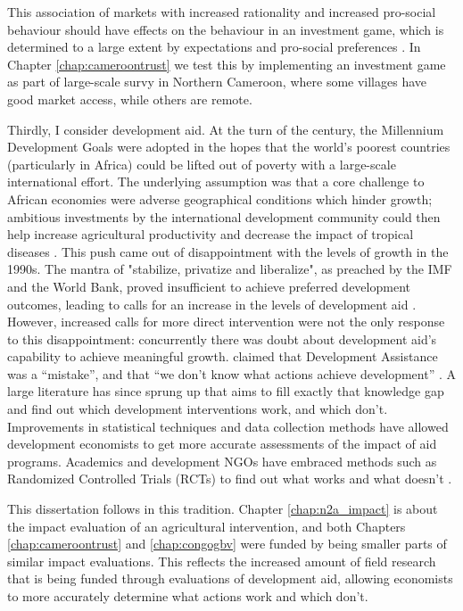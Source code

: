 This association of markets with increased rationality and increased pro-social behaviour should have effects on the behaviour in an investment game, which is determined to a large extent by expectations and pro-social preferences \citep{Berg1995,Ashraf2006,Roth1995,Sapienza2013}. In Chapter \ref{chap:cameroontrust} we test this by implementing an investment game as part of large-scale survy in Northern Cameroon, where some villages have good market access, while others are remote.


Thirdly, I consider development aid. At the turn of the century, the Millennium Development Goals were adopted in the hopes that the world's poorest countries (particularly in Africa) could be lifted out of poverty with a large-scale international effort. The underlying assumption was that a core challenge to African economies were adverse geographical conditions which hinder growth; ambitious investments by the international development community could then help increase agricultural productivity and decrease the impact of tropical diseases \citep{Sachs2005}. This push came out of disappointment with the levels of growth in the 1990s. The mantra of "stabilize, privatize and liberalize", as preached by the IMF and the World Bank, proved insufficient to achieve preferred development outcomes, leading to calls  for an increase in the levels of development aid \citep{Rodrik2006a}. However, increased calls for more direct intervention were not the only response to this disappointment: concurrently there was doubt about development aid's capability to achieve meaningful growth. \citet{Easterly2007} claimed that Development Assistance was a ``mistake'', and that ``we don't know what actions achieve development'' . A large literature has since sprung up that aims to fill exactly that knowledge gap and find out which development interventions work, and which don't. Improvements in statistical techniques and data collection methods have allowed development economists to get more accurate assessments of the impact of aid programs. Academics and development NGOs have embraced methods such as Randomized Controlled Trials (RCTs) to find out what works and what doesn't \citep[see e.g.][]{Bannerjee2011}.  

This dissertation follows in this tradition. Chapter \ref{chap:n2a_impact} is about the impact evaluation of an agricultural intervention, and both Chapters \ref{chap:cameroontrust} and \ref{chap:congogbv} were funded by being smaller parts of similar impact evaluations. This reflects the increased amount of field research that is being funded through evaluations of development aid, allowing economists to more accurately determine what actions work and which don't. 

